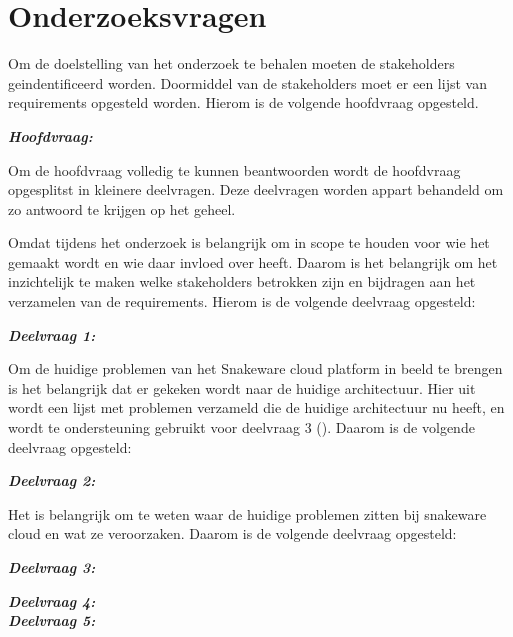 \section{Onderzoeksvragen}
Om de doelstelling van het onderzoek te behalen moeten de stakeholders geindentificeerd worden.
Doormiddel van de stakeholders moet er een lijst van requirements opgesteld worden.
Hierom is de volgende hoofdvraag opgesteld.

\whitespace
\textit{\textbf{Hoofdvraag:} \MainQuestion}

\whitespace
Om de hoofdvraag volledig te kunnen beantwoorden wordt de hoofdvraag opgesplitst in kleinere deelvragen.
Deze deelvragen worden appart behandeld om zo antwoord te krijgen op het geheel.

\whitespace
Omdat tijdens het onderzoek is belangrijk om in scope te houden voor wie het gemaakt wordt en wie daar invloed over heeft.
Daarom is het belangrijk om het inzichtelijk te maken welke stakeholders betrokken zijn en bijdragen aan het verzamelen van de requirements.
Hierom is de volgende deelvraag opgesteld:

\whitespace
\textit{\textbf{Deelvraag 1:} \SubquestionOne}

\whitespace
Om de huidige problemen van het Snakeware cloud platform in beeld te brengen is het belangrijk dat er gekeken wordt naar de huidige architectuur.
Hier uit wordt een lijst met problemen verzameld die de huidige architectuur nu heeft, en wordt te ondersteuning gebruikt voor deelvraag 3 (\textit{\SubquestionThree}).
Daarom is de volgende deelvraag opgesteld:

\whitespace
\textit{\textbf{Deelvraag 2:} \SubquestionTwo}

\whitespace
Het is belangrijk om te weten waar de huidige problemen zitten bij snakeware cloud en wat ze veroorzaken.
Daarom is de volgende deelvraag opgesteld:

\whitespace

\textit{\textbf{Deelvraag 3:} \SubquestionThree}

\whitespace
\textit{\textbf{Deelvraag 4:} \SubquestionFour} \\

\textit{\textbf{Deelvraag 5:} \SubquestionFive} \\
